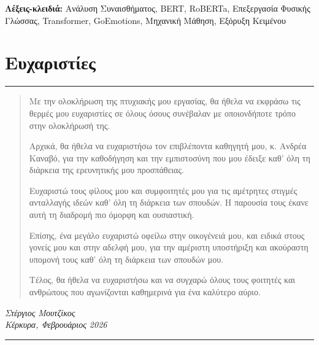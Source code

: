 \documentclass[a4paper,11pt,oneside,openany]{ioniothesis}
\begin{document}
\vspace{0.8cm}
\noindent\textbf{Λέξεις-κλειδιά:} Ανάλυση Συναισθήματος, BERT, RoBERTa, Επεξεργασία Φυσικής Γλώσσας, Transformer, GoEmotions, Μηχανική Μάθηση, Εξόρυξη Κειμένου

\newpage

\section*{Ευχαριστίες}


\begin{center}
\rule{0.5\textwidth}{0.4pt}
\end{center}

\begin{quotation}
\itshape

Με την ολοκλήρωση της πτυχιακής μου εργασίας, θα ήθελα να εκφράσω τις θερμές μου ευχαριστίες σε όλους όσους συνέβαλαν με οποιονδήποτε τρόπο στην ολοκλήρωσή της.

\medskip

Αρχικά, θα ήθελα να ευχαριστήσω τον επιβλέποντα καθηγητή μου, κ. Ανδρέα Καναβό, για την καθοδήγηση και την εμπιστοσύνη που μου έδειξε καθ' όλη τη διάρκεια της ερευνητικής μου προσπάθειας.

\medskip

Ευχαριστώ τους φίλους μου και συμφοιτητές μου για τις αμέτρητες στιγμές ανταλλαγής ιδεών καθ' όλη τη διάρκεια των σπουδών. Η παρουσία τους έκανε αυτή τη διαδρομή πιο όμορφη και ουσιαστική.

\medskip

Επίσης, ένα μεγάλο ευχαριστώ οφείλω στην οικογένειά μου, και ειδικά στους γονείς μου και στην αδελφή μου, για την αμέριστη υποστήριξη και ακούραστη υπομονή τους καθ' όλη τη διάρκεια των σπουδών μου.

\medskip

Τέλος, θα ήθελα να ευχαριστήσω και να συγχαρώ όλους τους φοιτητές και ανθρώπους που αγωνίζονται καθημερινά για ένα καλύτερο αύριο.

\end{quotation}

\begin{flushright}
\textit{Στέργιος Μουτζίκος}\\
\textit{Κέρκυρα, Φεβρουάριος 2026}
\end{flushright}

\begin{center}
\rule{0.5\textwidth}{0.4pt}
\end{center}
\end{document}
